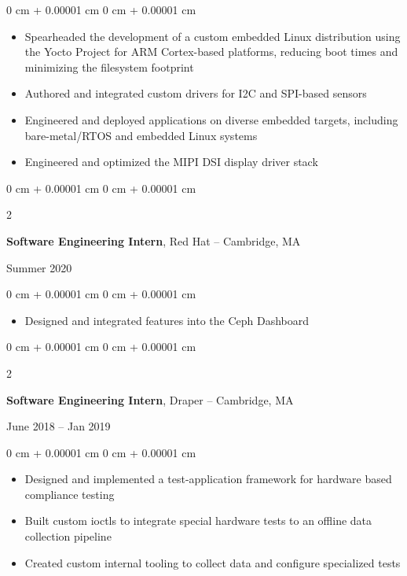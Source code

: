 \documentclass[10pt, letterpaper]{article}
\newenvironment{onecolentry}{
    \begin{adjustwidth}{
        0 cm + 0.00001 cm
    }{
        0 cm + 0.00001 cm
    }
}{
    \end{adjustwidth}
} %
\newenvironment{twocolentry}[2][]{
    \onecolentry
    \def\secondColumn{#2}
    \setcolumnwidth{\fill, 6.0 cm}
    \begin{paracol}{2}
}{
    \switchcolumn \raggedleft \secondColumn
    \end{paracol}
    \endonecolentry
} %
\begin{document}
        \vspace{0.10 cm}
        \begin{onecolentry}
          \begin{itemize}
                \item Spearheaded the development of a custom embedded Linux
                  distribution using the Yocto Project for ARM Cortex-based
                  platforms, reducing boot times and minimizing the
                  filesystem footprint
                \item Authored and integrated custom drivers for I2C and SPI-based sensors
                \item Engineered and deployed applications on diverse embedded targets, including bare-metal/RTOS and embedded Linux systems
                \item Engineered and optimized the MIPI DSI display driver stack
              \end{itemize}
        \end{onecolentry}
        
        \vspace{0.2 cm}

        \begin{twocolentry}{
            Summer 2020
        }
        \textbf{Software Engineering Intern}, Red Hat -- Cambridge, MA
        \end{twocolentry}

        \vspace{0.10 cm}
        \begin{onecolentry}
          \begin{itemize}
            \item Designed and integrated features into the Ceph Dashboard
          \end{itemize}
        \end{onecolentry}
        
        \vspace{0.2cm}

        \begin{twocolentry}{
            June 2018 – Jan 2019
        }
            \textbf{Software Engineering Intern}, Draper -- Cambridge, MA
        \end{twocolentry}

        \vspace{0.10 cm}
        \begin{onecolentry}
          \begin{itemize}
              \item Designed and implemented a test-application framework for hardware based compliance testing
              \item Built custom ioctls to integrate special hardware tests to an offline data collection pipeline
              \item Created custom internal tooling to collect data and configure specialized tests
            \end{itemize}
        \end{onecolentry}
\end{document}
